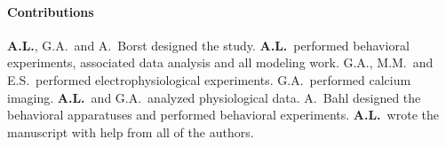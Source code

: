 \paragraph{Contributions}
\textbf{A.L.}, G.A.\ and A.\ Borst designed the study. \textbf{A.L.}\ performed behavioral experiments, associated data analysis and all modeling work. G.A., M.M.\ and E.S.\ performed electrophysiological experiments. G.A.\ performed calcium imaging. \textbf{A.L.}\ and G.A.\ analyzed physiological data. A.\ Bahl designed the behavioral apparatuses and performed behavioral experiments. \textbf{A.L.}\ wrote the manuscript with help from all of the authors.

\cleardoublepage


